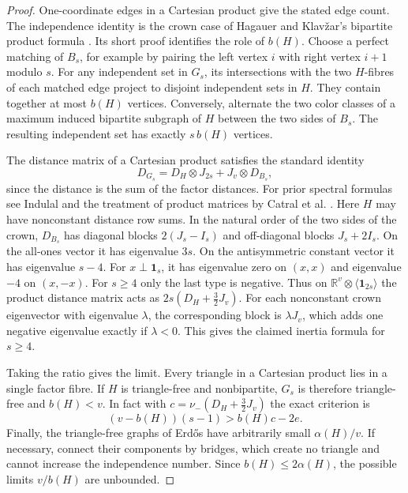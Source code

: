 \documentclass[11pt,a4paper]{article}
\begin{document}
\begin{proof}
One-coordinate edges in a Cartesian product give the stated edge count.
The independence identity is the crown case of Hagauer and Klav\v zar's bipartite product
formula \cite[Prop.~7.3]{ikr313}. Its short proof identifies the role of
$b(H)$. Choose a perfect matching of $B_s$, for example by pairing the
left vertex $i$ with right vertex $i+1$ modulo $s$. For any independent
set in $G_s$, its intersections with the two $H$-fibres of each matched
edge project to disjoint independent sets in $H$. They contain together
at most $b(H)$ vertices. Conversely, alternate the two color classes of a
maximum induced bipartite subgraph of $H$ between the two sides of $B_s$.
The resulting independent set has exactly $s\,b(H)$ vertices.

The distance matrix of a Cartesian product satisfies the standard identity
\[
 D_{G_s}=D_H\otimes J_{2s}+J_v\otimes D_{B_s},
\]
since the distance is the sum of the factor distances. For prior spectral formulas see Indulal and the treatment of product matrices by Catral et al. \cite{indulal313,catral}. Here $H$
may have nonconstant distance row sums. In the natural order of the two
sides of the crown, $D_{B_s}$ has diagonal blocks $2(J_s-I_s)$ and
off-diagonal blocks $J_s+2I_s$. On the all-ones vector it has eigenvalue
$3s$. On the antisymmetric constant vector it has eigenvalue $s-4$.
For $x\perp\mathbf1_s$, it has eigenvalue zero on $(x,x)$ and eigenvalue
$-4$ on $(x,-x)$. For $s\ge4$ only the last type is negative. Thus on
$\mathbb R^v\otimes\langle\mathbf1_{2s}\rangle$ the product distance matrix
acts as $2s(D_H+\tfrac32J_v)$. For each nonconstant crown eigenvector
with eigenvalue $\lambda$, the corresponding block is $\lambda J_v$,
which adds one negative eigenvalue exactly if $\lambda<0$. This gives the
claimed inertia formula for $s\ge4$.

Taking the ratio gives the limit. Every triangle in a Cartesian product lies
in a single factor fibre. If $H$ is triangle-free and nonbipartite, $G_s$
is therefore triangle-free and $b(H)<v$. In fact with
$c=\nu_-(D_H+\tfrac32J_v)$ the exact criterion is
\[
             (v-b(H))(s-1)>b(H)c-2e.
\]
Finally, the triangle-free graphs of Erd\H{o}s \cite{erd313} have arbitrarily
small $\alpha(H)/v$. If necessary, connect their components by bridges,
which create no triangle and cannot increase the independence number.
Since $b(H)\le2\alpha(H)$, the possible limits $v/b(H)$ are unbounded.
\end{proof}
\end{document}
